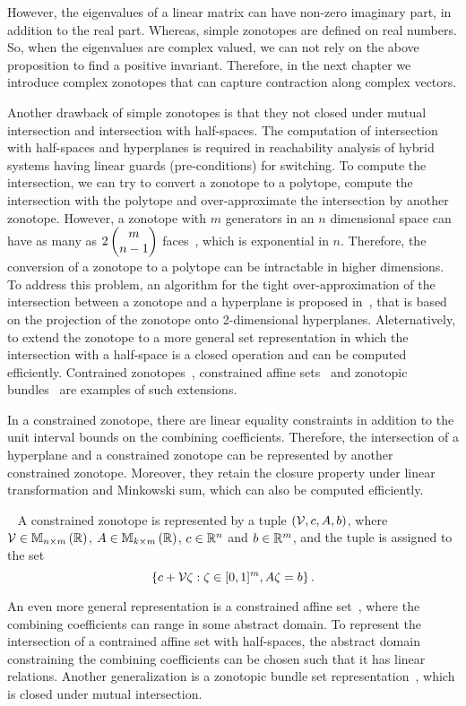 %
However, the eigenvalues of a linear matrix can have non-zero
imaginary part, in addition to the real part.  Whereas, simple
zonotopes are defined on real numbers.  So, when the eigenvalues are
complex valued, we can not rely on the above proposition to find a
positive invariant.  Therefore, in the next chapter we introduce
complex zonotopes that can capture contraction along complex vectors.

Another drawback of simple zonotopes is that they not closed under
mutual intersection and intersection with half-spaces.  The
computation of intersection with half-spaces and hyperplanes is
required in reachability analysis of hybrid systems having linear
guards (pre-conditions) for switching.  To compute the intersection,
we can try to convert a zonotope to a polytope, compute the
intersection with the polytope and over-approximate the intersection
by another zonotope.  However, a zonotope with $m$ generators in an
$n$ dimensional space can have as many as
$2\left(\begin{matrix}m\\n-1\end{matrix}\right)$
faces~\cite{zaslavsky1975facing}, which is exponential in $n$.
Therefore, the conversion of a zonotope to a polytope can be
intractable in higher dimensions.  To address this problem, an
algorithm for the tight over-approximation of the intersection between
a zonotope and a hyperplane is proposed in~\cite{girard2008zonotope},
that is based on the projection of the zonotope onto 2-dimensional
hyperplanes.  Aleternatively, to extend the zonotope to a more general
set representation in which the intersection with a half-space is a
closed operation and can be computed efficiently.  Contrained
zonotopes~\cite{scott2016constrained}, constrained affine sets~\cite{Ghorbal2010} and
zonotopic bundles~\cite{althoff2011zonotope} are examples of such extensions.

In a constrained zonotope, there are linear equality constraints in
addition to the unit interval bounds on the combining coefficients.
Therefore, the intersection of a hyperplane and a constrained zonotope
can be represented by another constrained zonotope.  Moreover, they
retain the closure property under linear transformation and Minkowski
sum, which can also be computed efficiently.
%
\begin{definition}~\cite{scott2016constrained}
A constrained zonotope is represented by a tuple
$\left(\mathcal{V},c,A,b\right)$, where $\mathcal{V}\in\mathbb{M}_{n\times m}\left(\mathbb{R}\right)$,
$A\in\mathbb{M}_{k\times m}\left(\mathbb{R}\right)$, $c\in\mathbb{R}^n$ and $b\in\mathbb{R}^m$, and
the tuple is assigned to the set
%
\[\left\{c+\mathcal{V}\zeta:\zeta\in[0,1]^m,A\zeta=b\right\}.\]
%
\end{definition}
%
An even more general representation is a constrained affine
set~\cite{Ghorbal2010}, where the combining coefficients can range in some
abstract domain.  To represent the intersection of a contrained affine
set with half-spaces, the abstract domain constraining the combining
coefficients can be chosen such that it has linear relations.  Another
generalization is a zonotopic bundle set representation~\cite{althoff2011zonotopex},
which is closed under mutual intersection.

